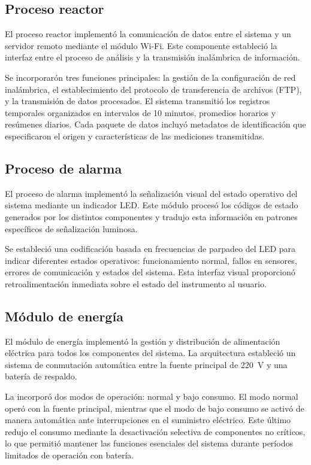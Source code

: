 \subsection{Proceso reactor}

El proceso reactor implementó la comunicación de datos entre el sistema y un servidor remoto mediante el módulo Wi-Fi. Este componente estableció la interfaz entre el proceso de análisis y la transmisión inalámbrica de información.

Se incorporarón tres funciones principales: la gestión de la configuración de red inalámbrica, el establecimiento del protocolo de transferencia de archivos (FTP), y la transmisión de datos procesados. El sistema transmitió los registros temporales organizados en intervalos de 10 minutos, promedios horarios y resúmenes diarios. Cada paquete de datos incluyó metadatos de identificación que especificaron el origen y características de las mediciones transmitidas.

\subsection{Proceso de alarma}
El proceso de alarma implementó la señalización visual del estado operativo del sistema mediante un indicador LED. Este módulo procesó los códigos de estado generados por los distintos componentes y tradujo esta información en patrones específicos de señalización luminosa.

Se estableció una codificación basada en frecuencias de parpadeo del LED para indicar diferentes estados operativos: funcionamiento normal, fallos en sensores, errores de comunicación y estados del sistema. Esta interfaz visual proporcionó retroalimentación inmediata sobre el estado del instrumento al usuario.

\subsection{Módulo de energía}
El módulo de energía implementó la gestión y distribución de alimentación eléctrica para todos los componentes del sistema. La arquitectura estableció un sistema de conmutación automática entre la fuente principal de \SI{220}{\volt} y una batería de respaldo.

La incorporó dos modos de operación: normal y bajo consumo. El modo normal operó con la fuente principal, mientras que el modo de bajo consumo se activó de manera automática ante interrupciones en el suministro eléctrico. Este último redujo el consumo mediante la desactivación selectiva de componentes no críticos, lo que permitió mantener las funciones esenciales del sistema durante períodos limitados de operación con batería.

